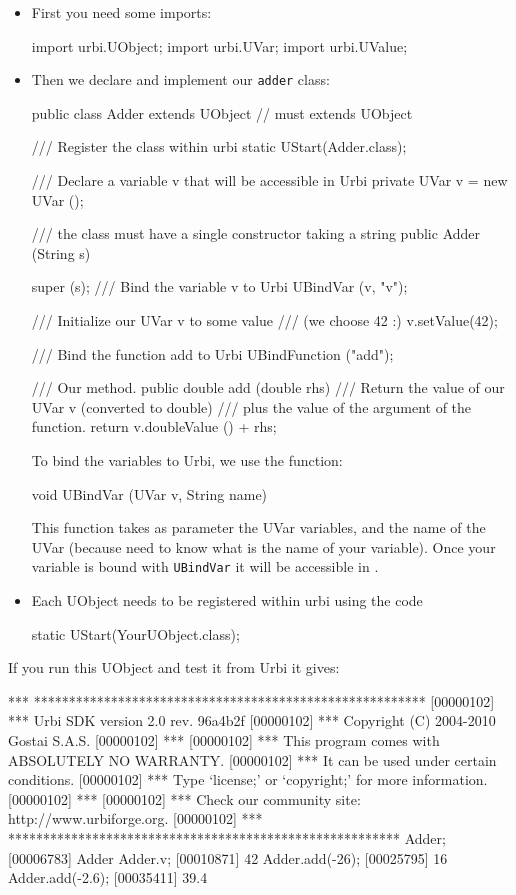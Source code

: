 \begin{itemize}
\item First you need some imports:

\begin{java}
import urbi.UObject;
import urbi.UVar;
import urbi.UValue;
\end{java}

\item Then we declare and implement our \lstinline{adder} class:
\begin{java}
public class Adder extends UObject // must extends UObject
{
  /// Register the class within urbi
  static { UStart(Adder.class); }

  /// Declare a variable v that will be accessible in Urbi
  private UVar v = new UVar ();

  /// the class must have a single constructor taking a string
  public Adder (String s)
  {
    super (s);
    /// Bind the variable v to Urbi
    UBindVar (v, "v");

    /// Initialize our UVar v to some value
    /// (we choose 42 :)
    v.setValue(42);

    /// Bind the function add to Urbi
    UBindFunction ("add");
  }

  /// Our method.
  public double add (double rhs)
  {
    /// Return the value of our UVar v (converted to double)
    /// plus the value of the argument of the function.
    return v.doubleValue () + rhs;
  }
}
\end{java}

To bind the variables to Urbi, we use the function:
\begin{java}
void UBindVar (UVar v, String name)
\end{java}

This function takes as parameter the UVar variables, and the name of the
UVar (because \urbi need to know what is the name of your variable).  Once
your variable is bound with \lstinline{UBindVar} it will be accessible in
\urbi.

\item Each UObject needs to be registered within urbi using the code
\begin{java}
static { UStart(YourUObject.class); }
\end{java}
\end{itemize}

If you run this UObject and test it from Urbi it gives:

\begin{urbiunchecked}
[00000102] *** ********************************************************
[00000102] *** Urbi SDK version 2.0 rev. 96a4b2f
[00000102] *** Copyright (C) 2004-2010 Gostai S.A.S.
[00000102] ***
[00000102] *** This program comes with ABSOLUTELY NO WARRANTY.
[00000102] *** It can be used under certain conditions.
[00000102] *** Type `license;' or `copyright;' for more information.
[00000102] ***
[00000102] *** Check our community site: http://www.urbiforge.org.
[00000102] *** ********************************************************
Adder;
[00006783] Adder
Adder.v;
[00010871] 42
Adder.add(-26);
[00025795] 16
Adder.add(-2.6);
[00035411] 39.4
\end{urbiunchecked}

